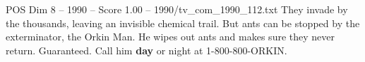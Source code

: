 \begin{textsample}{POS Dim 8 – 1990 – Score 1.00 – 1990/tv\_com\_1990\_112.txt}  \label{ex:f8_pos_073}
They invade by the thousands, leaving an invisible chemical trail.
But ants can be stopped by the exterminator, the Orkin Man.
He wipes out ants and makes sure they never return.
Guaranteed.
Call him \textbf{day} or night at 1-800-800-ORKIN.

\end{textsample}
